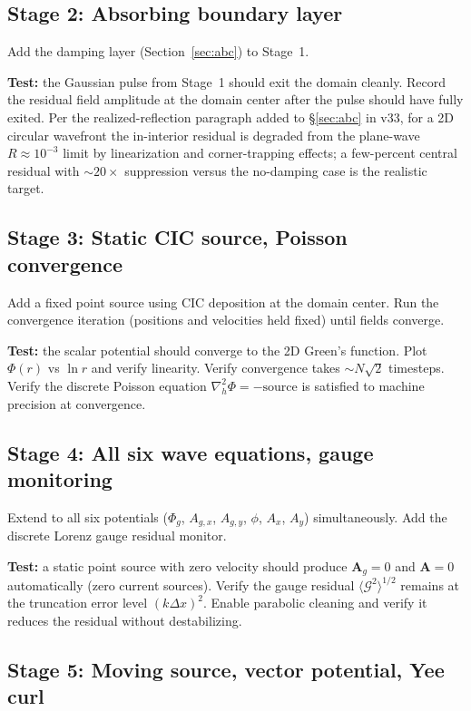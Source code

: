 \documentclass[11pt,a4paper]{article}
\newcommand{\vv}[1]{\mathbf{#1}}
\newcommand{\Phig}{\Phi_g}
\newcommand{\Ag}{\vv{A}_g}
\begin{document}
\subsection{Stage 2: Absorbing boundary layer}

Add the damping layer (Section~\ref{sec:abc}) to Stage~1.

\textbf{Test:} the Gaussian pulse from Stage~1 should exit the domain cleanly.  Record the residual field amplitude at the domain center after the pulse should have fully exited.  Per the realized-reflection paragraph added to §\ref{sec:abc} in v33, for a 2D circular wavefront the in-interior residual is degraded from the plane-wave $R\approx10^{-3}$ limit by linearization and corner-trapping effects; a few-percent central residual with $\sim20\times$ suppression versus the no-damping case is the realistic target.

\subsection{Stage 3: Static CIC source, Poisson convergence}

Add a fixed point source using CIC deposition at the domain center.  Run the convergence iteration (positions and velocities held fixed) until fields converge.

\textbf{Test:} the scalar potential should converge to the 2D Green's function.  Plot $\Phi(r)$ vs $\ln r$ and verify linearity.  Verify convergence takes $\sim N\sqrt{2}$ timesteps.  Verify the discrete Poisson equation $\nabla^2_{h}\Phi = -\mathrm{source}$ is satisfied to machine precision at convergence.

\subsection{Stage 4: All six wave equations, gauge monitoring}

Extend to all six potentials ($\Phig$, $A_{g,x}$, $A_{g,y}$, $\phi$, $A_x$, $A_y$) simultaneously.  Add the discrete Lorenz gauge residual monitor.

\textbf{Test:} a static point source with zero velocity should produce $\Ag = 0$ and $\vv{A} = 0$ automatically (zero current sources).  Verify the gauge residual $\langle\mathcal{G}^2\rangle^{1/2}$ remains at the truncation error level $(k\Delta x)^2$.  Enable parabolic cleaning and verify it reduces the residual without destabilizing.

\subsection{Stage 5: Moving source, vector potential, Yee curl}
\end{document}
